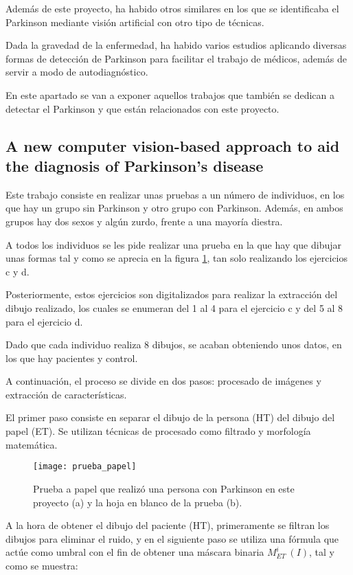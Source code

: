 Además de este proyecto, ha habido otros similares en los que se identificaba el Parkinson mediante visión artificial con otro tipo de técnicas.

Dada la gravedad de la enfermedad, ha habido varios estudios aplicando diversas formas de detección de Parkinson para facilitar el trabajo de médicos, además de servir a modo de autodiagnóstico.

En este apartado se van a exponer aquellos trabajos que también se dedican a detectar el Parkinson y que están relacionados con este proyecto.

\subsection{A new computer vision-based approach to aid the diagnosis of Parkinson's disease\cite{pereira2016new}}
Este trabajo consiste en realizar unas pruebas a un número de individuos, en los que hay un grupo sin Parkinson y otro grupo con Parkinson. Además, en ambos grupos hay dos sexos y algún zurdo, frente a una mayoría diestra.

A todos los individuos se les pide realizar una prueba en la que hay que dibujar unas formas tal y como se aprecia en la figura \ref{fig:pruebapapel}, tan solo realizando los ejercicios c y d.

Posteriormente, estos ejercicios son digitalizados para realizar la extracción del dibujo realizado, los cuales se enumeran del 1 al 4 para el ejercicio c y del 5 al 8 para el ejercicio d.

Dado que cada individuo realiza 8 dibujos, se acaban obteniendo unos datos, en los que hay pacientes y control.

A continuación, el proceso se divide en dos pasos: procesado de imágenes y extracción de características.

El primer paso consiste en separar el dibujo de la persona (HT) del dibujo del papel (ET). Se utilizan técnicas de procesado como filtrado y morfología matemática.

\begin{figure}[ht]
	\texttt{[image: prueba\_papel]}
	\caption{Prueba a papel que realizó una persona con Parkinson en este proyecto (a) y la hoja en blanco de la prueba (b).\cite{pereira2016new}}
	\label{fig:pruebapapel}
\end{figure}

A la hora de obtener el dibujo del paciente (HT), primeramente se filtran los dibujos para eliminar el ruido, y en el siguiente paso se utiliza una fórmula que actúe como umbral con el fin de obtener una máscara binaria \(M^{i}_{ET}\ (I)\), tal y como se muestra: 

